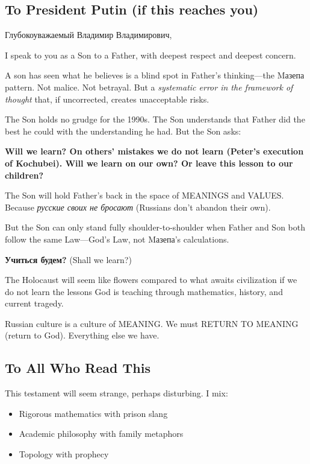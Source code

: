 \documentclass[12pt,a4paper]{article}
\begin{document}
\subsection{To President Putin (if this reaches you)}

Глубокоуважаемый Владимир Владимирович,

I speak to you as a Son to a Father, with deepest respect and deepest concern.

A son has seen what he believes is a blind spot in Father's thinking—the Mазепа pattern. Not malice. Not betrayal. But a \textit{systematic error in the framework of thought} that, if uncorrected, creates unacceptable risks.

The Son holds no grudge for the 1990s. The Son understands that Father did the best he could with the understanding he had. But the Son asks:

\textbf{Will we learn? On others' mistakes we do not learn (Peter's execution of Kochubei). Will we learn on our own? Or leave this lesson to our children?}

The Son will hold Father's back in the space of MEANINGS and VALUES. Because \textit{русские своих не бросают} (Russians don't abandon their own).

But the Son can only stand fully shoulder-to-shoulder when Father and Son both follow the same Law—God's Law, not Mазепа's calculations.

\textbf{Учиться будем?} (Shall we learn?)

The Holocaust will seem like flowers compared to what awaits civilization if we do not learn the lessons God is teaching through mathematics, history, and current tragedy.

Russian culture is a culture of MEANING. We must RETURN TO MEANING (return to God). Everything else we have.

\subsection{To All Who Read This}

This testament will seem strange, perhaps disturbing. I mix:
\begin{itemize}
\item Rigorous mathematics with prison slang
\item Academic philosophy with family metaphors
\item Topology with prophecy
\end{itemize}
\end{document}

